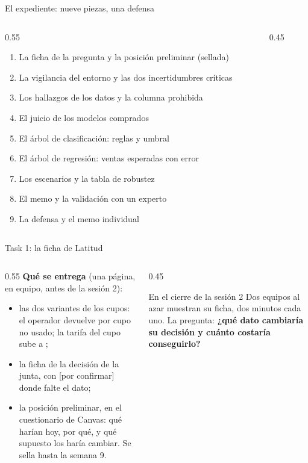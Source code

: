 \documentclass{beamer}
\begin{document}
\begin{frame}{El expediente: nueve piezas, una defensa}
\begin{columns}[T]
\begin{column}{0.55\textwidth}
\begin{enumerate}\small
  \item La ficha de la pregunta y la posición preliminar (sellada)
  \item La vigilancia del entorno y las dos incertidumbres críticas
  \item Los hallazgos de los datos y la columna prohibida
  \item El juicio de los modelos comprados
  \item El árbol de clasificación: reglas y umbral
  \item El árbol de regresión: ventas esperadas con error
  \item Los escenarios y la tabla de robustez
  \item El memo y la validación con un experto
  \item La defensa y el memo individual
\end{enumerate}
\end{column}
\begin{column}{0.45\textwidth}
\end{column}
\end{columns}
\end{frame}

\begin{frame}{Task 1: la ficha de Latitud}
\begin{columns}[T]
\begin{column}{0.55\textwidth}
\textbf{Qué se entrega} (una página, en equipo, antes de la sesión 2):
\begin{itemize}
  \item las dos variantes de los cupos: el operador devuelve  por cupo no usado; la tarifa del cupo sube a ;
  \item la ficha de la decisión de la junta, con [por confirmar] donde falte el dato;
  \item la posición preliminar, en el cuestionario de Canvas: qué harían hoy, por qué, y qué supuesto los haría cambiar. Se sella hasta la semana 9.
\end{itemize}
\end{column}
\begin{column}{0.45\textwidth}
\begin{exampleblock}{En el cierre de la sesión 2}
Dos equipos al azar muestran su ficha, dos minutos cada uno. La pregunta: \textbf{¿qué dato cambiaría su decisión y cuánto costaría conseguirlo?}
\end{exampleblock}
\end{column}
\end{columns}
\end{frame}
\end{document}
